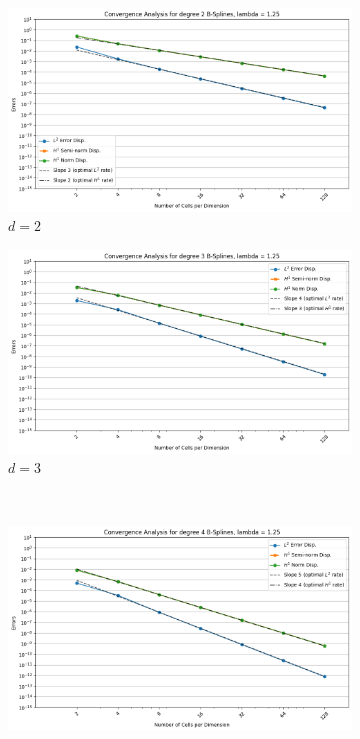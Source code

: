 \documentclass[a4paper,12pt,twoside]{report}
\begin{document}
\begin{figure}[!h]
	\centering
	\begin{subfigure}[b]{0.49\textwidth}
		\centering
		\includegraphics[width=\textwidth]{figures_non_mixed_DH/convergence_plot_degree_2_lambda=1.25.png}
		\caption{$d=2$}
		\label{fig:deg2_NMDHBC}
	\end{subfigure}
	\begin{subfigure}[b]{0.49\textwidth}
		\centering
		\includegraphics[width=\textwidth]{figures_non_mixed_DH/convergence_plot_degree_3_lambda=1.25.png}
		\caption{$d=3$}
		\label{fig:deg3_NMDHBC}
	\end{subfigure}
	\\
	\begin{subfigure}[b]{0.49\textwidth}
		\centering
		\includegraphics[width=\textwidth]{figures_non_mixed_DH/convergence_plot_degree_4_lambda=1.25.png}

\end{subfigure}
\end{figure}
\end{document}

